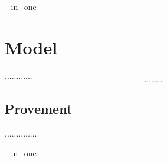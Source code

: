 \ifx\all_in_one\undefined


\fi

\section{Model}
............
\begin{equation}
........
\end{equation}
\subsection{Provement}
..............

\ifx\all_in_one\undefined

\fi
